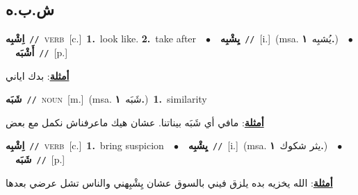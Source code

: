 \documentclass[10pt,a4paper,twoside]{article} %
\begin{document}
\begin{multicols}{2}
{{{{{{{{{{{{\vspace{-3mm}
\subsection*{\color{blue}\foreignlanguage{arabic}{ش.ب.ه}\color{blue}{}} 

{\setlength\topsep{0pt}\textbf{\foreignlanguage{arabic}{اِشْبِه}}\ {\color{gray}\texttt{//}\color{black}}\ \textsc{verb}\ [c.]\ \textbf{1.}~look like.  \textbf{2.}~take after\ \ $\bullet$\ \ \setlength\topsep{0pt}\textbf{\foreignlanguage{arabic}{يِشْبِه}}\ {\color{gray}\texttt{//}\color{black}}\ [i.]\ \color{gray}(msa. \foreignlanguage{arabic}{يُشبِه}~\foreignlanguage{arabic}{\textbf{١.}})\color{black}\ \ $\bullet$\ \ \setlength\topsep{0pt}\textbf{\foreignlanguage{arabic}{أَشْبَه}}\ {\color{gray}\texttt{//}\color{black}}\ [p.]\  \begin{flushright}\color{gray}\foreignlanguage{arabic}{\textbf{\underline{\foreignlanguage{arabic}{أمثلة}}}: بدك اياني}\end{flushright}\color{black}} \vspace{2mm}

{\setlength\topsep{0pt}\textbf{\foreignlanguage{arabic}{شَبَه}}\ {\color{gray}\texttt{//}\color{black}}\ \textsc{noun}\ [m.]\ \color{gray}(msa. \foreignlanguage{arabic}{شَبَه}~\foreignlanguage{arabic}{\textbf{١.}})\color{black}\ \textbf{1.}~similarity\  \begin{flushright}\color{gray}\foreignlanguage{arabic}{\textbf{\underline{\foreignlanguage{arabic}{أمثلة}}}: مافي أي شَبَه بيناتنا. عشان هيك ماعرفناش نكمل مع بعض}\end{flushright}\color{black}} \vspace{2mm}

{\setlength\topsep{0pt}\textbf{\foreignlanguage{arabic}{اِشْبِه}}\ {\color{gray}\texttt{//}\color{black}}\ \textsc{verb}\ [c.]\ \textbf{1.}~bring suspicion\ \ $\bullet$\ \ \setlength\topsep{0pt}\textbf{\foreignlanguage{arabic}{يِشْبِه}}\ {\color{gray}\texttt{//}\color{black}}\ [i.]\ \color{gray}(msa. \foreignlanguage{arabic}{يثر شكوك}~\foreignlanguage{arabic}{\textbf{١.}})\color{black}\ \ $\bullet$\ \ \setlength\topsep{0pt}\textbf{\foreignlanguage{arabic}{شَبَه}}\ {\color{gray}\texttt{//}\color{black}}\ [p.]\  \begin{flushright}\color{gray}\foreignlanguage{arabic}{\textbf{\underline{\foreignlanguage{arabic}{أمثلة}}}: الله يخزيه بده يلزق فيني بالسوق عشان يِشْبِهني والناس تشل عرضي بعدها}\end{flushright}\color{black}} \vspace{2mm}

}}}}}}}}}}}}
\end{multicols}
\end{document}
